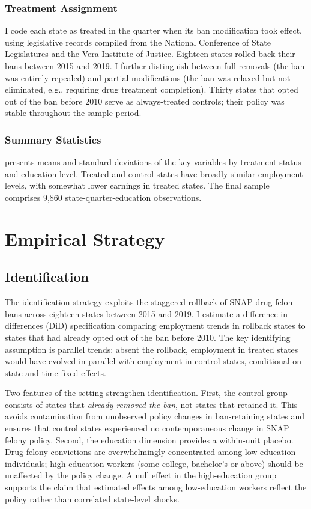 \documentclass[12pt]{article}
\begin{document}
\subsubsection*{Treatment Assignment} I code each state as treated in the quarter when its ban modification took effect, using legislative records compiled from the National Conference of State Legislatures and the Vera Institute of Justice. Eighteen states rolled back their bans between 2015 and 2019. I further distinguish between full removals (the ban was entirely repealed) and partial modifications (the ban was relaxed but not eliminated, e.g., requiring drug treatment completion). Thirty states that opted out of the ban before 2010 serve as always-treated controls; their policy was stable throughout the sample period.

\subsubsection*{Summary Statistics}  presents means and standard deviations of the key variables by treatment status and education level. Treated and control states have broadly similar employment levels, with somewhat lower earnings in treated states. The final sample comprises 9,860 state-quarter-education observations.



\section{Empirical Strategy}

\subsection{Identification}

The identification strategy exploits the staggered rollback of SNAP drug felon bans across eighteen states between 2015 and 2019. I estimate a difference-in-differences (DiD) specification comparing employment trends in rollback states to states that had already opted out of the ban before 2010. The key identifying assumption is parallel trends: absent the rollback, employment in treated states would have evolved in parallel with employment in control states, conditional on state and time fixed effects.

Two features of the setting strengthen identification. First, the control group consists of states that \textit{already removed the ban}, not states that retained it. This avoids contamination from unobserved policy changes in ban-retaining states and ensures that control states experienced no contemporaneous change in SNAP felony policy. Second, the education dimension provides a within-unit placebo. Drug felony convictions are overwhelmingly concentrated among low-education individuals; high-education workers (some college, bachelor's or above) should be unaffected by the policy change. A null effect in the high-education group supports the claim that estimated effects among low-education workers reflect the policy rather than correlated state-level shocks.
\end{document}
